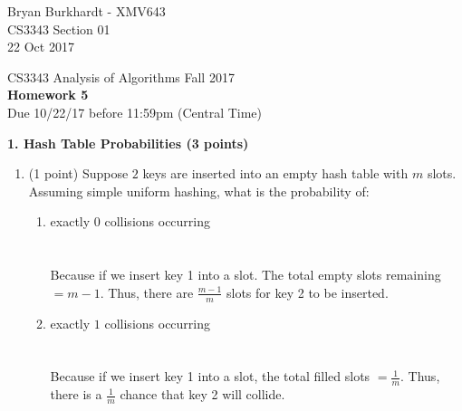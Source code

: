 \documentclass[12pt]{elsart}
\begin{document}
Bryan Burkhardt - XMV643\\
CS3343 Section 01\\
22 Oct 2017\\

\pagestyle{empty}

\begin{center}
\Large  CS3343 Analysis of Algorithms Fall 2017 \\
\large {\bf Homework 5}\\
\normalsize Due 10/22/17 before 11:59pm (Central Time)
\end{center}

{\bf 1.  Hash Table Probabilities (3 points)}

\begin{enumerate}
   \item (1 point) Suppose $2$ keys are inserted into an empty hash table with $m$ slots. Assuming
simple uniform hashing, what is the probability of:
\begin{enumerate}
   \item exactly $0$ collisions occurring\\\\
	\\
	Because if we insert key 1 into a slot. The total empty slots remaining $= m-1$. Thus, there are $\frac{m-1}{m}$ slots for key 2 to be inserted.\\
   \item exactly $1$ collisions occurring\\\\
	\\
	Because if we insert key 1 into a slot, the total filled slots $= \frac{1}{m}$. Thus, there is a $\frac{1}{m}$ chance that key 2 will collide.\\
\end{enumerate}


\end{enumerate}
\end{document}
